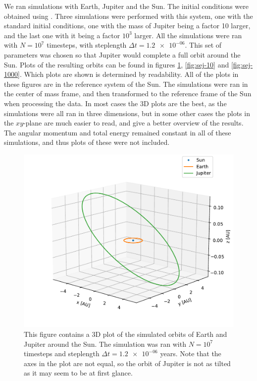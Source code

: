 \documentclass[reprint,english,notitlepage]{revtex4-1}  %
\begin{document}
We ran simulations with Earth, Jupiter and the Sun. The initial conditions were obtained using \citep{NASASolarInit}. Three simulations were performed with this system, one with the standard initial conditions, one with the mass of Jupiter being a factor 10 larger, and the last one with it being a factor $10^3$ larger. All the simulations were ran with $N=10^7$ timesteps, with steplength $\Delta t = \num{1.2e-06}$. This set of parameters was chosen so that Jupiter would complete a full orbit around the Sun. Plots of the resulting orbits can be found in figures \ref{fig:sej-standard}, \ref{fig:sej-10} and \ref{fig:sej-1000}. Which plots are shown is determined by readability. All of the plots in these figures are in the reference system of the Sun. The simulations were ran in the center of mass frame, and then transformed to the reference frame of the Sun when processing the data. In most cases the 3D plots are the best, as the simulations were all ran in three dimensions, but in some other cases the plots in the $xy$-plane are much easier to read, and give a better overview of the results. The angular momentum and total energy remained constant in all of these simulations, and thus plots of these were not included.

\begin{figure}[H]
\includegraphics[width=\columnwidth]{../data/figures/sun-earth-jupiter/sej_1xM_vv_orbit3D.pdf}
\caption{This figure contains a 3D plot of the simulated orbits of Earth and Jupiter around the Sun. The simulation was ran with $N=10^7$ timesteps and steplength $\Delta t = \num{1.2e-06}$ years. Note that the axes in the plot are not equal, so the orbit of Jupiter is not as tilted as it may seem to be at first glance.}
\label{fig:sej-standard}
\end{figure}
\end{document}
